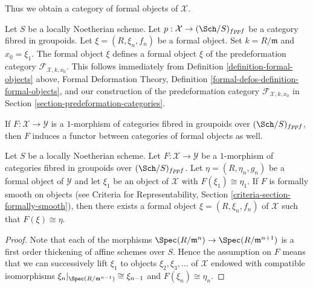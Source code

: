 \noindent
Thus we obtain a category of formal objects of $\mathcal{X}$.

\begin{remark}
\label{remark-formal-objects-match}
Let $S$ be a locally Noetherian scheme. Let
$p : \mathcal{X} \to (\Sch/S)_{fppf}$ be a category fibred in groupoids.
Let $\xi = (R, \xi_n, f_n)$ be a formal object. Set $k = R/\mathfrak m$ and
$x_0 = \xi_1$. The formal object $\xi$ defines a formal object
$\xi$ of the predeformation category $\mathcal{F}_{\mathcal{X}, k, x_0}$.
This follows immediately from
Definition \ref{definition-formal-objects} above,
Formal Deformation Theory, Definition
\ref{formal-defos-definition-formal-objects},
and our construction of the predeformation category
$\mathcal{F}_{\mathcal{X}, k, x_0}$ in
Section \ref{section-predeformation-categories}.
\end{remark}

\noindent
If $F : \mathcal{X} \to \mathcal{Y}$ is a $1$-morphism of categories fibred
in groupoids over $(\Sch/S)_{fppf}$, then $F$ induces a functor between
categories of formal objects as well.

\begin{lemma}
\label{lemma-smooth-lift-formal}
Let $S$ be a locally Noetherian scheme. Let $F : \mathcal{X} \to \mathcal{Y}$
be a $1$-morphism of categories fibred in groupoids over $(\Sch/S)_{fppf}$.
Let $\eta = (R, \eta_n, g_n)$ be a formal object of $\mathcal{Y}$
and let $\xi_1$ be an object of $\mathcal{X}$ with $F(\xi_1) \cong \eta_1$.
If $F$ is formally smooth on objects (see
Criteria for Representability, Section \ref{criteria-section-formally-smooth}),
then there exists a formal object $\xi = (R, \xi_n, f_n)$ of $\mathcal{X}$
such that $F(\xi) \cong \eta$.
\end{lemma}

\begin{proof}
Note that each of the morphisms
$\Spec(R/\mathfrak m^n) \to \Spec(R/\mathfrak m^{n + 1})$ is a first order
thickening of affine schemes over $S$. Hence the assumption on $F$ means
that we can successively lift $\xi_1$ to objects $\xi_2, \xi_3, \ldots$
of $\mathcal{X}$ endowed with compatible isomorphisms
$\xi_n|_{\Spec(R/\mathfrak m^{n - 1})} \cong \xi_{n - 1}$
and $F(\xi_n) \cong \eta_n$.
\end{proof}

